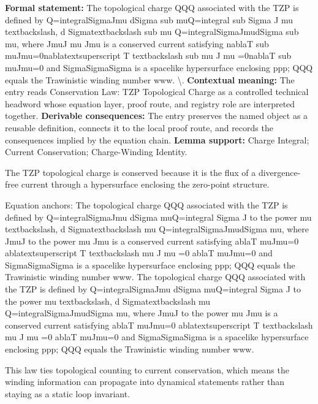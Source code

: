 \begingroup\footnotesize\setlength{\emergencystretch}{3em}\sloppy
\textbf{Formal statement:} The topological charge QQQ associated with the TZP is defined by Q=integralSigmaJmu dSigma sub muQ=integral sub Sigma J mu textbackslash, d Sigmatextbackslash sub mu Q=integralSigmaJmudSigma sub mu, where JmuJ mu Jmu is a conserved current satisfying nablaT sub muJmu=0nablatextsuperscript T textbackslash sub mu J mu =0nablaT sub muJmu=0 and SigmaSigmaSigma is a spacelike hypersurface enclosing ppp; QQQ equals the Trawinistic winding number www. \textbackslash{}. \textbf{Contextual meaning:} The entry reads Conservation Law: TZP Topological Charge as a controlled technical headword whose equation layer, proof route, and registry role are interpreted together. \textbf{Derivable consequences:} The entry preserves the named object as a reusable definition, connects it to the local proof route, and records the consequences implied by the equation chain. \textbf{Lemma support:} Charge Integral; Current Conservation; Charge-Winding Identity.\par
\endgroup

The TZP topological charge is conserved because it is the flux of a divergence-free current through a hypersurface enclosing the zero-point structure.

Equation anchors: The topological charge QQQ associated with the TZP is defined by Q=integralSigmaJmu dSigma muQ=integral Sigma J to the power mu textbackslash, d Sigmatextbackslash mu Q=integralSigmaJmudSigma mu, where JmuJ to the power mu Jmu is a conserved current satisfying ablaT muJmu=0 ablatextsuperscript T textbackslash mu J mu =0 ablaT muJmu=0 and SigmaSigmaSigma is a spacelike hypersurface enclosing ppp; QQQ equals the Trawinistic winding number www. The topological charge QQQ associated with the TZP is defined by Q=integralSigmaJmu dSigma muQ=integral Sigma J to the power mu textbackslash, d Sigmatextbackslash mu Q=integralSigmaJmudSigma mu, where JmuJ to the power mu Jmu is a conserved current satisfying ablaT muJmu=0 ablatextsuperscript T textbackslash mu J mu =0 ablaT muJmu=0 and SigmaSigmaSigma is a spacelike hypersurface enclosing ppp; QQQ equals the Trawinistic winding number www.

This law ties topological counting to current conservation, which means the winding information can propagate into dynamical statements rather than staying as a static loop invariant.
\endgroup

